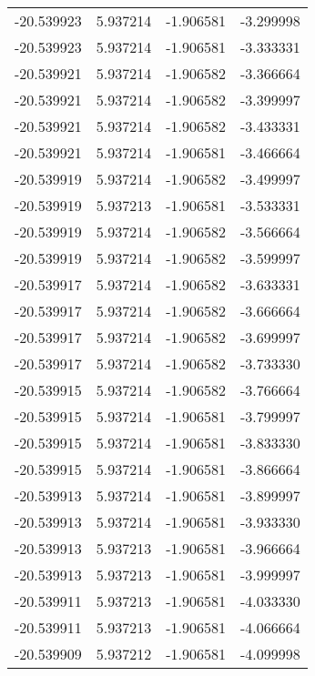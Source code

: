 \begin{tabular}{rrrr}
      -20.539923 &         5.937214 &   -1.906581 &  -3.299998 \\
      -20.539923 &         5.937214 &   -1.906581 &  -3.333331 \\
      -20.539921 &         5.937214 &   -1.906582 &  -3.366664 \\
      -20.539921 &         5.937214 &   -1.906582 &  -3.399997 \\
      -20.539921 &         5.937214 &   -1.906582 &  -3.433331 \\
      -20.539921 &         5.937214 &   -1.906581 &  -3.466664 \\
      -20.539919 &         5.937214 &   -1.906582 &  -3.499997 \\
      -20.539919 &         5.937213 &   -1.906581 &  -3.533331 \\
      -20.539919 &         5.937214 &   -1.906582 &  -3.566664 \\
      -20.539919 &         5.937214 &   -1.906582 &  -3.599997 \\
      -20.539917 &         5.937214 &   -1.906582 &  -3.633331 \\
      -20.539917 &         5.937214 &   -1.906582 &  -3.666664 \\
      -20.539917 &         5.937214 &   -1.906582 &  -3.699997 \\
      -20.539917 &         5.937214 &   -1.906582 &  -3.733330 \\
      -20.539915 &         5.937214 &   -1.906582 &  -3.766664 \\
      -20.539915 &         5.937214 &   -1.906581 &  -3.799997 \\
      -20.539915 &         5.937214 &   -1.906581 &  -3.833330 \\
      -20.539915 &         5.937214 &   -1.906581 &  -3.866664 \\
      -20.539913 &         5.937214 &   -1.906581 &  -3.899997 \\
      -20.539913 &         5.937214 &   -1.906581 &  -3.933330 \\
      -20.539913 &         5.937213 &   -1.906581 &  -3.966664 \\
      -20.539913 &         5.937213 &   -1.906581 &  -3.999997 \\
      -20.539911 &         5.937213 &   -1.906581 &  -4.033330 \\
      -20.539911 &         5.937213 &   -1.906581 &  -4.066664 \\
      -20.539909 &         5.937212 &   -1.906581 &  -4.099998 \\

\end{tabular}
